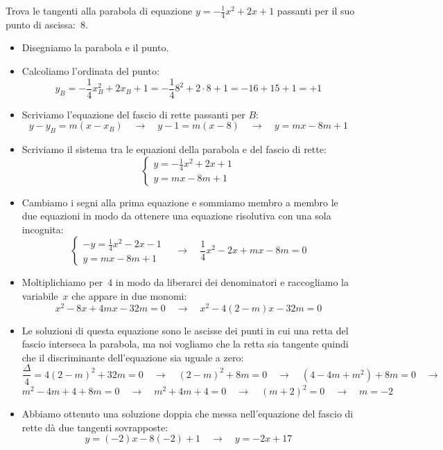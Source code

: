 \begin{esempio}
 Trova le tangenti alla parabola di equazione $y=-\frac{1}{4}x^2+2x +1$ 
 passanti per il suo punto di ascissa:~$8$.
 
 \begin{itemize}
  \item Disegniamo la parabola e il punto.
  \item Calcoliamo l'ordinata del punto:
\[y_B=-\frac{1}{4}x_B^2+2x_B+1=-\frac{1}{4}8^2+2 \cdot 8+1= -16+15+1=+1\]
  \item Scriviamo l'equazione del fascio di rette passanti per $B$:
\[y-y_B = m(x-x_B) \quad \rightarrow \quad 
y-1 = m\left(x-8\right)
\quad \rightarrow \quad y=mx-8m+1\]
  \item Scriviamo il sistema tra le equazioni della parabola e del fascio di 
   rette:
\[\left\{\begin{array}{l}
  y=-\frac{1}{4}x^2+2x +1\\
  y=mx-8m+1
\end{array}\right. \]
  \item Cambiamo i segni alla prima equazione e sommiamo membro a membro le
   due equazioni in modo da ottenere una equazione risolutiva con una sola 
   incognita:
\[\left\{\begin{array}{l}
  -y=\frac{1}{4}x^2-2x-1\\
  y=mx-8m+1
\end{array}\right. \quad \rightarrow \quad 
\frac{1}{4}x^2-2x+mx-8m=0\]
  \item Moltiplichiamo per~$4$ in modo da liberarci dei denominatori e 
   raccogliamo la variabile~$x$ che appare in due monomi:
\[x^2-8x+4mx-32m=0 \quad \rightarrow \quad x^2-4(2-m)x-32m=0\]
  \item Le soluzioni di questa equazione sono le ascisse dei punti in cui una 
   retta del fascio interseca la parabola, ma noi vogliamo che la retta sia
   tangente quindi che il discriminante dell'equazione sia uguale a zero:
\[\frac{\Delta}{4}=4(2-m)^2+32m=0 \quad \rightarrow \quad 
(2-m)^2+8m=0 \quad \rightarrow \quad
(4-4m+m^2)+8m=0 \quad \rightarrow \quad\]
\[m^2-4m+4+8m=0 \quad \rightarrow \quad
m^2+4m+4=0 \quad \rightarrow \quad
(m+2)^2=0  \quad \rightarrow \quad m=-2\]
  \item Abbiamo ottenuto una soluzione doppia che messa nell'equazione del 
   fascio di rette dà due tangenti sovrapposte:
\[y=(-2)x-8(-2)+1 \quad \rightarrow \quad y=-2x+17\]
 \end{itemize}
\end{esempio}

